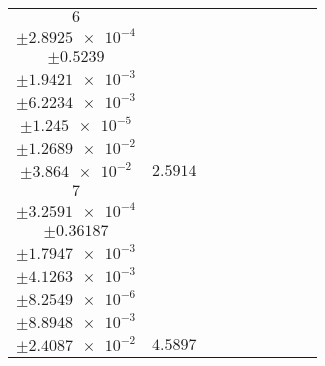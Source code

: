 \documentclass[8pt]{article}
\begin{document}
\begin{longtable}[l]{c c c c c c c c c}
$\num{6}$ & \begin{tabular}[c]{@{}c@{}}$\num{3.0627e-2}$ \\ $\pm\num{2.8925e-4}$\end{tabular} & \begin{tabular}[c]{@{}c@{}}$\num{1.2816}$ \\ $\pm\num{0.5239}$\end{tabular} & \begin{tabular}[c]{@{}c@{}}$\num{7.908}$ \\ $\pm\num{1.9421e-3}$\end{tabular} & \begin{tabular}[c]{@{}c@{}}$\num{3.5556e+3}$ \\ $\pm\num{6.2234e-3}$\end{tabular} & \begin{tabular}[c]{@{}c@{}}$\num{7.1132}$ \\ $\pm\num{1.245e-5}$\end{tabular} & \begin{tabular}[c]{@{}c@{}}$\num{1.2207}$ \\ $\pm\num{1.2689e-2}$\end{tabular} & \begin{tabular}[c]{@{}c@{}}$\num{4.2658}$ \\ $\pm\num{3.864e-2}$\end{tabular} & $\num{2.5914}$\\
$\num{7}$ & \begin{tabular}[c]{@{}c@{}}$\num{5.9303e-2}$ \\ $\pm\num{3.2591e-4}$\end{tabular} & \begin{tabular}[c]{@{}c@{}}$\num{-0.25268}$ \\ $\pm\num{0.36187}$\end{tabular} & \begin{tabular}[c]{@{}c@{}}$\num{-4.3331}$ \\ $\pm\num{1.7947e-3}$\end{tabular} & \begin{tabular}[c]{@{}c@{}}$\num{3.5788e+3}$ \\ $\pm\num{4.1263e-3}$\end{tabular} & \begin{tabular}[c]{@{}c@{}}$\num{7.1596}$ \\ $\pm\num{8.2549e-6}$\end{tabular} & \begin{tabular}[c]{@{}c@{}}$\num{1.6282}$ \\ $\pm\num{8.8948e-3}$\end{tabular} & \begin{tabular}[c]{@{}c@{}}$\num{4.4497}$ \\ $\pm\num{2.4087e-2}$\end{tabular} & $\num{4.5897}$\\

\end{longtable}
\end{document}
